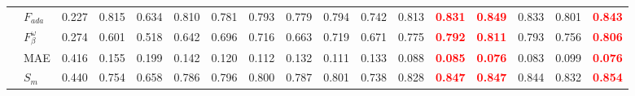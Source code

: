 \documentclass[runningheads]{llncs}
\begin{document}
\begin{table}[t]
{\begin{tabular}{@{}rl|ccccccccccc|cc|cc@{}}
    & $F_{ada}$            & 0.227                                     & 0.815                                       & 0.634                                       & 0.810                                  & 0.781                                      & 0.793                                          & 0.779                                      & 0.794                                        & 0.742                                            & 0.813                                      & \textcolor{red}{\textbf{0.831}} & \textcolor{red}{\textbf{0.849}}                & 0.833                           & 0.801                                     & \textcolor{red}{\textbf{0.843}} \\
    & $F_{\beta}^{\omega}$ & 0.274                                     & 0.601                                       & 0.518                                       & 0.642                                  & 0.696                                      & 0.716                                          & 0.663                                      & 0.719                                        & 0.671                                            & 0.775                                      & \textcolor{red}{\textbf{0.792}} & \textcolor{red}{\textbf{0.811}}                & 0.793                           & 0.756                                     & \textcolor{red}{\textbf{0.806}} \\
    & MAE                  & 0.416                                     & 0.155                                       & 0.199                                       & 0.142                                  & 0.120                                      & 0.112                                          & 0.132                                      & 0.111                                        & 0.133                                            & 0.088                                      & \textcolor{red}{\textbf{0.085}} & \textcolor{red}{\textbf{0.076}}                & 0.083                           & 0.099                                     & \textcolor{red}{\textbf{0.076}} \\
    & $S_{m}$              & 0.440                                     & 0.754                                       & 0.658                                       & 0.786                                  & 0.796                                      & 0.800                                          & 0.787                                      & 0.801                                        & 0.738                                            & 0.828                                      & \textcolor{red}{\textbf{0.847}} & \textcolor{red}{\textbf{0.847}}                & 0.844                           & 0.832                                     & \textcolor{red}{\textbf{0.854}} \\

\end{tabular}}
\end{table}
\end{document}
